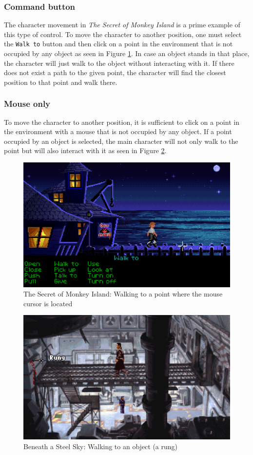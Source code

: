 
\subsubsection{Command button}
The character movement in \textit{The Secret of Monkey Island} is a prime example of this type of control. To move the character to another position, one must select the \texttt{Walk to} button and then click on a point in the environment that is not occupied by any object as seen in Figure \ref{fig:M-TSoMI}. In case an object stands in that place, the character will just walk to the object without interacting with it. If there does not exist a path to the given point, the character will find the closest position to that point and walk there.

\subsubsection{Mouse only}
To move the character to another position, it is sufficient to click on a point in the environment with a mouse that is not occupied by any object. If a point occupied by an object is selected, the main character will not only walk to the point but will also interact with it as seen in Figure \ref{fig:M-BaSS}.

\begin{figure}[H]
\centering
\includegraphics[width=.8\linewidth]{img/W-TSoMI.png}
\caption{The Secret of Monkey Island: Walking to a point where the mouse cursor is located}
\label{fig:M-TSoMI}
\end{figure}

\begin{figure}[H]
\centering
\includegraphics[width=.8\linewidth]{img/M-BaSS.png}
\caption{Beneath a Steel Sky: Walking to an object (a rung)}
\label{fig:M-BaSS}
\end{figure}

